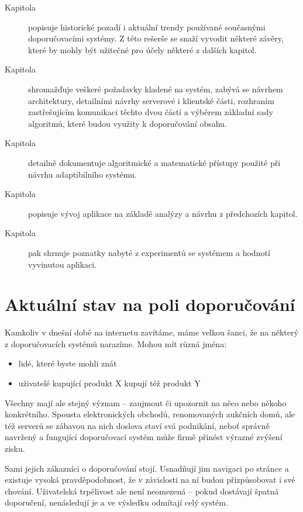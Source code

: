 \documentclass[thesis=M,czech]{FITthesis}[2014/05/07]
\begin{document}
\begin{introduction}
\begin{description}
  \item[Kapitola]  popisuje historické pozadí i aktuální trendy používané současnými doporučovacími systémy. Z této rešerše se snaží vyvodit některé závěry, které by mohly být užitečné pro účely některé z dalších kapitol.
  \item[Kapitola]  shromažďuje veškeré požadavky kladené na systém, zabývá se návrhem architektury, detailními návrhy serverové i klientské části, rozhraním zastřešujícím komunikaci těchto dvou částí a výběrem základní sady algoritmů, které budou využity k doporučování obsahu. 
  \item[Kapitola]  detailně dokumentuje algoritmické a matematické přístupy použité při návrhu adaptibilního systému. 
  \item[Kapitola]  popisuje vývoj aplikace na základě analýzy a návrhu z předchozích kapitol. 
  \item[Kapitola]  pak shrnuje poznatky nabyté z experimentů se systémem a hodnotí vyvinutou aplikaci. 
\end{description}
	
\end{introduction}
	
\chapter{Aktuální stav na poli doporučování}	
\label{chap:current}

Kamkoliv v dnešní době na internetu zavítáme, máme velkou šanci, že na některý z doporučovacích systémů narazíme. Mohou mít různá jména:

\begin{itemize}
	\item lidé, které byste mohli znát
	\item uživatelé kupující produkt X kupují též produkt Y
\end{itemize}

Všechny mají ale stejný význam – zaujmout či upozornit na něco nebo někoho konkrétního. Spousta elektronických obchodů, renomovaných aukčních domů, ale též serverů se zábavou na nich doslova staví svá podnikání, neboť správně navržený a fungující doporučovací systém může firmě přinést výrazné zvýšení zisku. 

Sami jejich zákazníci o doporučování stojí. Usnadňují jim navigaci po stránce a existuje vysoká pravděpodobnost, že v závislosti na ní budou přizpůsobovat i své chování. Uživatelská trpělivost ale není neomezená – pokud dostávají špatná doporučení, nenásledují je a ve výsledku odmítají celý systém.
\end{document}
